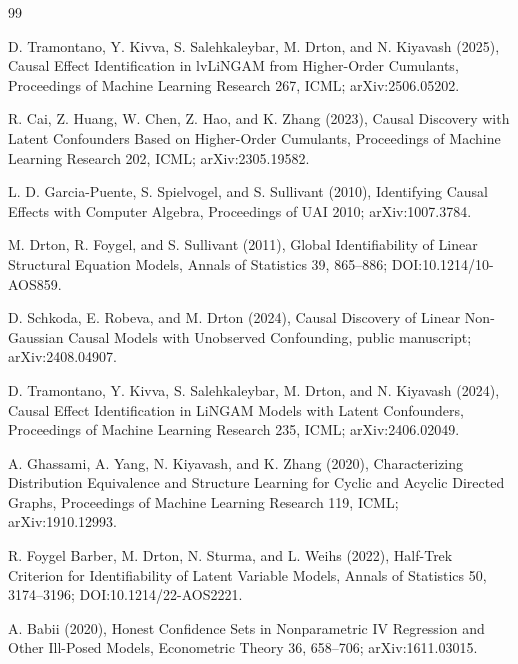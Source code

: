 \documentclass{article}
\begin{document}
\begin{thebibliography}{99}

   D. Tramontano, Y. Kivva, S. Salehkaleybar, M. Drton, and N. Kiyavash (2025), Causal Effect Identification in lvLiNGAM from Higher-Order Cumulants, Proceedings of Machine Learning Research 267, ICML; arXiv:2506.05202.

   R. Cai, Z. Huang, W. Chen, Z. Hao, and K. Zhang (2023), Causal Discovery with Latent Confounders Based on Higher-Order Cumulants, Proceedings of Machine Learning Research 202, ICML; arXiv:2305.19582.

   L. D. Garcia-Puente, S. Spielvogel, and S. Sullivant (2010), Identifying Causal Effects with Computer Algebra, Proceedings of UAI 2010; arXiv:1007.3784.

   M. Drton, R. Foygel, and S. Sullivant (2011), Global Identifiability of Linear Structural Equation Models, Annals of Statistics 39, 865--886; DOI:10.1214/10-AOS859.

   D. Schkoda, E. Robeva, and M. Drton (2024), Causal Discovery of Linear Non-Gaussian Causal Models with Unobserved Confounding, public manuscript; arXiv:2408.04907.

   D. Tramontano, Y. Kivva, S. Salehkaleybar, M. Drton, and N. Kiyavash (2024), Causal Effect Identification in LiNGAM Models with Latent Confounders, Proceedings of Machine Learning Research 235, ICML; arXiv:2406.02049.

   A. Ghassami, A. Yang, N. Kiyavash, and K. Zhang (2020), Characterizing Distribution Equivalence and Structure Learning for Cyclic and Acyclic Directed Graphs, Proceedings of Machine Learning Research 119, ICML; arXiv:1910.12993.

   R. Foygel Barber, M. Drton, N. Sturma, and L. Weihs (2022), Half-Trek Criterion for Identifiability of Latent Variable Models, Annals of Statistics 50, 3174--3196; DOI:10.1214/22-AOS2221.

   A. Babii (2020), Honest Confidence Sets in Nonparametric IV Regression and Other Ill-Posed Models, Econometric Theory 36, 658--706; arXiv:1611.03015.


\end{thebibliography}
\end{document}
